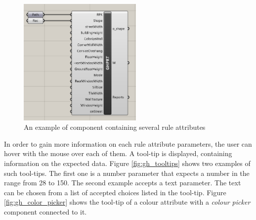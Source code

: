 \begin{figure}[h]
    \centering
    \includegraphics[width=60mm]{res/man_gh_rule_attributes}
    \caption{An example of component containing several rule attributes}
    \label{fig:gh_rule_attribs}
\end{figure}

\newpage

In order to gain more information on each rule attribute parameters, the user can hover with the mouse over each of them. A tool-tip is displayed, containing information on the expected data. Figure \ref{fig:gh_tooltips} shows two examples of such tool-tips. The first one is a number parameter that expects a number in the range from 28 to 150. The second example accepts a text parameter. The text can be chosen from a list of accepted choices listed in the tool-tip. Figure \ref{fig:gh_color_picker} shows the tool-tip of a colour attribute with a \textit{colour picker} component connected to it.

